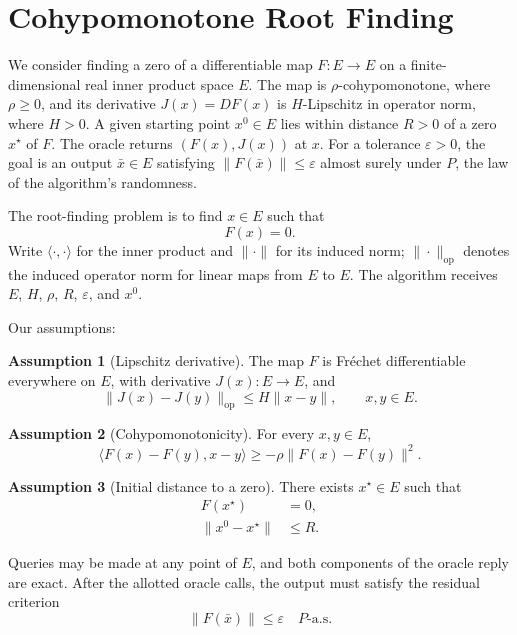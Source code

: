 \documentclass[10pt]{article}
\theoremstyle{definition}
\newtheorem{assumption}{Assumption}
\begin{document}
\section*{Cohypomonotone Root Finding}
We consider finding a zero of a differentiable map $F:E\to E$ on a finite-dimensional real inner product space $E$. The map is $\rho$-cohypomonotone, where $\rho\geq 0$, and its derivative $J(x)=DF(x)$ is $H$-Lipschitz in operator norm, where $H>0$. A given starting point $x^0\in E$ lies within distance $R>0$ of a zero $x^\star$ of $F$. The oracle returns $(F(x),J(x))$ at $x$. For a tolerance $\varepsilon>0$, the goal is an output $\bar{x}\in E$ satisfying $\|F(\bar{x})\|\leq\varepsilon$ almost surely under $P$, the law of the algorithm's randomness.

The root-finding problem is to find $x\in E$ such that
\[
F(x)=0.
\]
Write $\langle\cdot,\cdot\rangle$ for the inner product and $\|\cdot\|$ for its induced norm; $\|\cdot\|_{\mathrm{op}}$ denotes the induced operator norm for linear maps from $E$ to $E$. The algorithm receives $E$, $H$, $\rho$, $R$, $\varepsilon$, and $x^0$.

Our assumptions:
\begin{assumption}[Lipschitz derivative]
The map $F$ is Fr\'echet differentiable everywhere on $E$, with derivative $J(x):E\to E$, and
\[
\|J(x)-J(y)\|_{\mathrm{op}}\leq H\|x-y\|,
\qquad x,y\in E.
\]
\end{assumption}

\begin{assumption}[Cohypomonotonicity]
For every $x,y\in E$,
\[
\langle F(x)-F(y),x-y\rangle
\geq -\rho\|F(x)-F(y)\|^2.
\]
\end{assumption}

\begin{assumption}[Initial distance to a zero]
There exists $x^\star\in E$ such that
\[
\begin{aligned}
F(x^\star)&=0,\\
\|x^0-x^\star\|&\leq R.
\end{aligned}
\]
\end{assumption}

Queries may be made at any point of $E$, and both components of the oracle reply are exact. After the allotted oracle calls, the output must satisfy the residual criterion
\[
\|F(\bar{x})\|\leq\varepsilon
\quad P\text{-a.s.}
\]
\end{document}
